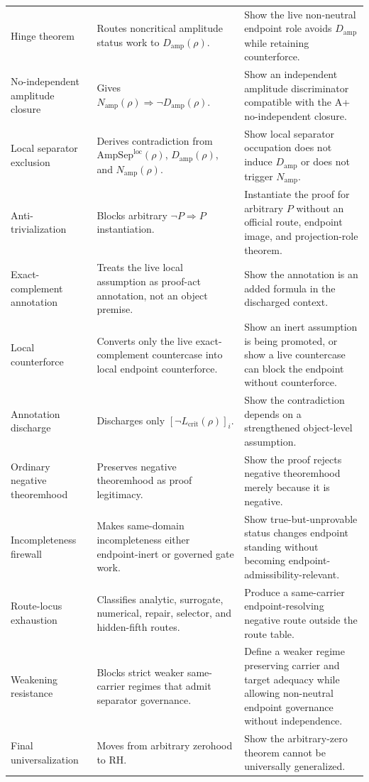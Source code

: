 \documentclass[11pt]{article}
\newcommand{\Lcrit}{L_{\mathrm{crit}}}
\newcommand{\AmpSepLoc}{\mathrm{AmpSep}^{\mathrm{loc}}}
\newcommand{\Damp}{D_{\mathrm{amp}}}
\newcommand{\Namp}{N_{\mathrm{amp}}}
\begin{document}
\begin{longtable}{L{0.21\textwidth}L{0.31\textwidth}L{0.37\textwidth}}
Hinge theorem & Routes noncritical amplitude status work to \(\Damp(\rho)\). & Show the live non-neutral endpoint role avoids \(\Damp\) while retaining counterforce.\\
No-independent amplitude closure & Gives \(\Namp(\rho)\Rightarrow\neg\Damp(\rho)\). & Show an independent amplitude discriminator compatible with the A+ no-independent closure.\\
Local separator exclusion & Derives contradiction from \(\AmpSepLoc(\rho)\), \(\Damp(\rho)\), and \(\Namp(\rho)\). & Show local separator occupation does not induce \(\Damp\) or does not trigger \(\Namp\).\\
Anti-trivialization & Blocks arbitrary \(\neg P\Rightarrow P\) instantiation. & Instantiate the proof for arbitrary \(P\) without an official route, endpoint image, and projection-role theorem.\\
Exact-complement annotation & Treats the live local assumption as proof-act annotation, not an object premise. & Show the annotation is an added formula in the discharged context.\\
Local counterforce & Converts only the live exact-complement countercase into local endpoint counterforce. & Show an inert assumption is being promoted, or show a live countercase can block the endpoint without counterforce.\\
Annotation discharge & Discharges only \([\neg\Lcrit(\rho)]_i\). & Show the contradiction depends on a strengthened object-level assumption.\\
Ordinary negative theoremhood & Preserves negative theoremhood as proof legitimacy. & Show the proof rejects negative theoremhood merely because it is negative.\\
Incompleteness firewall & Makes same-domain incompleteness either endpoint-inert or governed gate work. & Show true-but-unprovable status changes endpoint standing without becoming endpoint-admissibility-relevant.\\
Route-locus exhaustion & Classifies analytic, surrogate, numerical, repair, selector, and hidden-fifth routes. & Produce a same-carrier endpoint-resolving negative route outside the route table.\\
Weakening resistance & Blocks strict weaker same-carrier regimes that admit separator governance. & Define a weaker regime preserving carrier and target adequacy while allowing non-neutral endpoint governance without independence.\\
Final universalization & Moves from arbitrary zerohood to RH. & Show the arbitrary-zero theorem cannot be universally generalized.\\
\bottomrule
\end{longtable}
\endgroup
\end{document}
